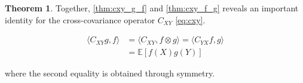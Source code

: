 \documentclass[twoside]{article} \usepackage{aistats2017}
\theoremstyle{definition}
\newtheorem{theorem}{Theorem}[section]
\newcommand{\rv}[1]{{#1}}
\newcommand{\expect}[1]{{\mathbb{E}[#1]}}
\newcommand{\inner}[2]{{\langle #1, #2 \rangle}}
\newcommand{\Cxy}{C_{\rv{X} \rv{Y}}}
\newcommand{\Cyx}{C_{\rv{Y} \rv{X}}}
\begin{document}
		\begin{theorem}
			Together, \cref{thm:cxy_g_f} and \cref{thm:cxy_f_g} reveals an important identity for the cross-covariance operator $\Cxy$ \eqref{eq:cxy}.
			
			\begin{equation}
			\begin{aligned}
				 \inner{\Cxy g}{f} &= \inner{\Cxy}{f \otimes g} = \inner{\Cyx f}{g} \\
				 &= \expect{f(\rv{X}) g(\rv{Y})}
				 \label{eq:cxy}			
			\end{aligned}
			\end{equation}
			
			where the second equality is obtained through symmetry. \\
		\end{theorem}
	
\end{document}

